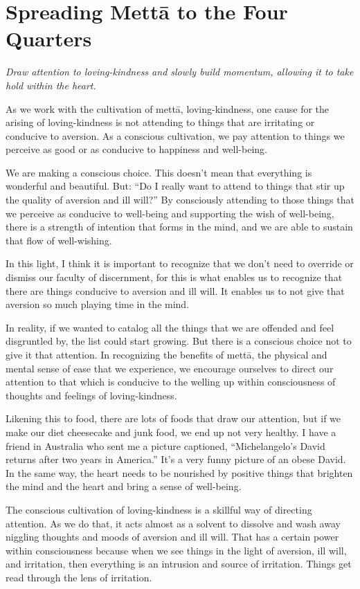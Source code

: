 \chapter{Spreading Mettā to the Four
Quarters}

\epigraph{\emph{Draw attention to loving-kindness and slowly build
momentum, allowing it to take hold within the heart.}}{}

As we work with the cultivation of mettā, loving-kindness, one cause for
the arising of loving-kindness is not attending to things that are
irritating or conducive to aversion. As a conscious cultivation, we pay
attention to things we perceive as good or as conducive to happiness and
well-being.

We are making a conscious choice. This doesn’t mean that everything is
wonderful and beautiful. But: “Do I really want to attend to things that
stir up the quality of aversion and ill will?” By consciously attending
to those things that we perceive as conducive to well-being and
supporting the wish of well-being, there is a strength of intention that
forms in the mind, and we are able to sustain that flow of well-wishing.

In this light, I think it is important to recognize that we don’t need
to override or dismiss our faculty of discernment, for this is what
enables us to recognize that there are things conducive to aversion and
ill will. It enables us to not give that aversion so much playing time
in the mind.

In reality, if we wanted to catalog all the things that we are offended
and feel disgruntled by, the list could start growing. But there is a
conscious choice not to give it that attention. In recognizing the
benefits of mettā, the physical and mental sense of ease that we
experience, we encourage ourselves to direct our attention to that which
is conducive to the welling up within consciousness of thoughts and
feelings of loving-kindness.

Likening this to food, there are lots of foods that draw our attention,
but if we make our diet cheesecake and junk food, we end up not very
healthy. I have a friend in Australia who sent me a picture captioned,
“Michelangelo’s David returns after two years in America.” It’s a very
funny picture of an obese David. In the same way, the heart needs to be
nourished by positive things that brighten the mind and the heart and
bring a sense of well-being.

The conscious cultivation of loving-kindness is a skillful way of
directing attention. As we do that, it acts almost as a solvent to
dissolve and wash away niggling thoughts and moods of aversion and ill
will. That has a certain power within consciousness because when we see
things in the light of aversion, ill will, and irritation, then
everything is an intrusion and source of irritation. Things get read
through the lens of irritation.

